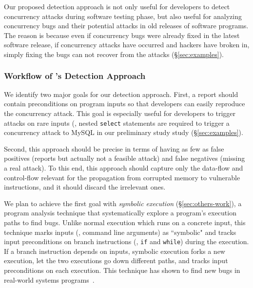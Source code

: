Our proposed detection approach is not only useful for developers to detect 
concurrency attacks during software testing phase, but also useful for 
analyzing concurrency bugs and their potential attacks in old releases of 
software programs. The reason is because even if 
concurrency bugs were already fixed in the latest software release, if 
concurrency attacks have occurred and hackers have broken in, simply fixing 
the bugs can not recover from the attacks (\S\ref{sec:examples}).


\vspace{-.15in}\subsubsection{Workflow of \xxx's Detection Approach}
\label{sec:detect-arch}\vspace{-.075in}

We identify two major goals for our detection approach. First, a report should 
contain preconditions on program inputs so that developers can easily reproduce 
the concurrency attack. This goal is especially useful for developers to 
trigger attacks on rare inputs (\eg, nested \texttt{select} statements are 
required to trigger a concurrency attack to MySQL in our preliminary 
study study (\S\ref{sec:examples}).

Second, this approach should be precise in terms of having as few as false 
positives (reports but actually not a feasible attack) and false negatives 
(missing a real attack). To this end, this approach should capture only the 
data-flow and control-flow relevant for the propagation from corrupted memory 
to vulnerable instructions, and it should discard the irrelevant ones. 

We plan to achieve the first goal with \emph{symbolic 
execution} (\S\ref{sec:others-work}), a program analysis technique that 
systematically explore a program's execution paths to find bugs. Unlike normal 
execution which runs on a concrete input, this technique marks inputs (\eg, 
command line arguments) as ``symbolic" and tracks input preconditions 
on branch instructions (\eg, \texttt{if} and \texttt{while}) during the 
execution. If a branch instruction depends on inputs, symbolic execution forks 
a new execution, let the two executions go down different paths, and tracks 
input preconditions on each execution. This technique has shown to find new 
bugs in real-world systems programs~\cite{klee:osdi08}.

